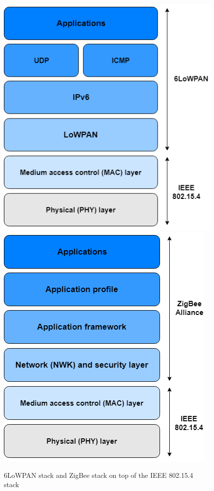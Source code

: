 \begin{figure}[H]
\centering
\includegraphics[scale=0.4]{figure/6LoWPANstack.png}
\includegraphics[scale=0.4]{figure/ZigBeestack.png}
\caption{6LoWPAN stack and ZigBee stack on top of the IEEE 802.15.4 stack}
\label{fig:protocolstacks}
\end{figure}

